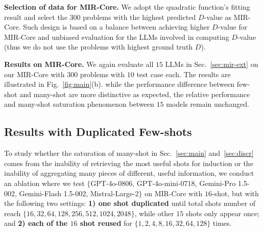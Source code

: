 


\textbf{Selection of data for MIR-Core.} We adopt the quadratic function's fitting result and select the $300$ problems with the highest predicted $D$-value as MIR-Core. Such design is based on a balance between achieving higher $D$-value for MIR-Core and unbiased evaluation for the LLMs involved in computing $D$-value (thus we do not use the problems with highest ground truth $D$).

\textbf{Results on MIR-Core.} We again evaluate all $15$ LLMs in Sec.~\ref{sec:mir-ext} on our MIR-Core with $300$ problems with $10$ test case each. The results are illustrated in Fig.~\ref{fig:main}(b). while the performance difference between few-shot and many-shot are more distinctive as expected, the relative performance and many-shot saturation phenomenon between $15$ models remain unchanged.


\subsection{Results with Duplicated Few-shots}
\label{sec:ablation_dup}

To study whether the saturation of many-shot in Sec.~\ref{sec:main} and~\ref{sec:discr} comes from the inability of retrieving the most useful shots for induction or the inability of aggregating many pieces of different, useful information, we conduct an ablation where we test $\{$GPT-4o-0806, GPT-4o-mini-0718, Gemini-Pro 1.5-002, Gemini-Flash 1.5-002, Mistral-Large-2$\}$ on MIR-Core with $16$-shot, but with the following two settings: \textbf{1) one shot duplicated} until total shots number of reach $\{16, 32, 64, 128, 256, 512, 1024, 2048\}$, while other $15$ shots only appear once; and \textbf{2) each of the $16$ shot reused} for $\{1, 2, 4, 8, 16, 32, 64, 128\}$ times.

